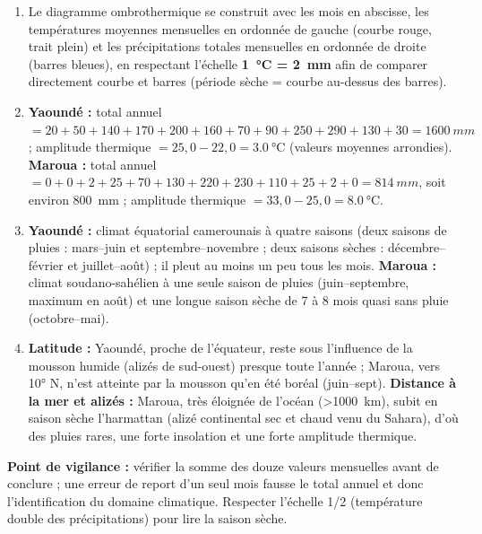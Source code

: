 \documentclass[11pt]{article}
\begin{document}
\begin{corrige}
\begin{enumerate}
\item Le diagramme ombrothermique se construit avec les mois en abscisse, les températures moyennes mensuelles en ordonnée de gauche (courbe rouge, trait plein) et les précipitations totales mensuelles en ordonnée de droite (barres bleues), en respectant l'échelle \textbf{\SI{1}{\celsius} = \SI{2}{mm}} afin de comparer directement courbe et barres (période sèche = courbe au-dessus des barres).
\item \textbf{Yaoundé :} total annuel $= 20+50+140+170+200+160+70+90+250+290+130+30 = \SI{1600}{mm}$ ; amplitude thermique $= 25,0 - 22,0 = \SI{3,0}{\celsius}$ (valeurs moyennes arrondies). \textbf{Maroua :} total annuel $= 0+0+2+25+70+130+220+230+110+25+2+0 = \SI{814}{mm}$, soit environ \SI{800}{mm} ; amplitude thermique $= 33,0 - 25,0 = \SI{8,0}{\celsius}$.
\item \textbf{Yaoundé :} climat équatorial camerounais à quatre saisons (deux saisons de pluies : mars--juin et septembre--novembre ; deux saisons sèches : décembre--février et juillet--août) ; il pleut au moins un peu tous les mois. \textbf{Maroua :} climat soudano-sahélien à une seule saison de pluies (juin--septembre, maximum en août) et une longue saison sèche de 7 à 8 mois quasi sans pluie (octobre--mai).
\item \textbf{Latitude :} Yaoundé, proche de l'équateur, reste sous l'influence de la mousson humide (alizés de sud-ouest) presque toute l'année ; Maroua, vers 10° N, n'est atteinte par la mousson qu'en été boréal (juin--sept). \textbf{Distance à la mer et alizés :} Maroua, très éloignée de l'océan (\SI{>1000}{km}), subit en saison sèche l'harmattan (alizé continental sec et chaud venu du Sahara), d'où des pluies rares, une forte insolation et une forte amplitude thermique.
\end{enumerate}
\textbf{Point de vigilance :} vérifier la somme des douze valeurs mensuelles avant de conclure ; une erreur de report d'un seul mois fausse le total annuel et donc l'identification du domaine climatique. Respecter l'échelle 1/2 (température double des précipitations) pour lire la saison sèche.
\end{corrige}
\end{document}
